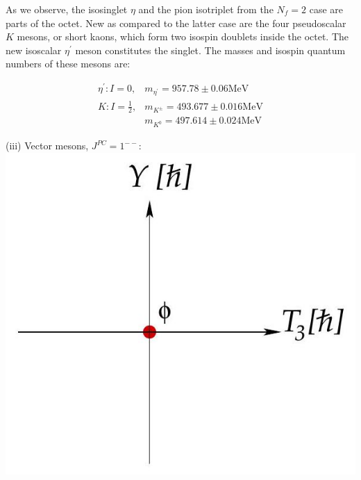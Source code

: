 \documentclass[10pt, letterpaper]{article}
\begin{document}
As we observe, the isosinglet $\eta$ and the pion isotriplet from the $N_{f}=2$ case are parts of the octet. New as compared to the latter case are the four pseudoscalar $K$ mesons, or short kaons, which form two isospin doublets inside the octet. The new isoscalar $\eta^{\prime}$ meson constitutes the singlet. The masses and isospin quantum numbers of these mesons are:


$$\begin{array}{ll}
    \eta^{\prime}: I=0, & m_{\eta^{\prime}}=957.78 \pm 0.06 \mathrm{MeV} \\
    K: I=\frac{1}{2}, & m_{K^{ \pm}}=493.677 \pm 0.016 \mathrm{MeV} \\
    & m_{K^{0}}=497.614 \pm 0.024 \mathrm{MeV}
\end{array}$$
    

(iii) Vector mesons, $J^{P C}=1^{--}$:\\
\includegraphics[scale=0.3, center]{2025_05_20_8618f55a41bfe980b4b2g-70}\\
\end{document}
